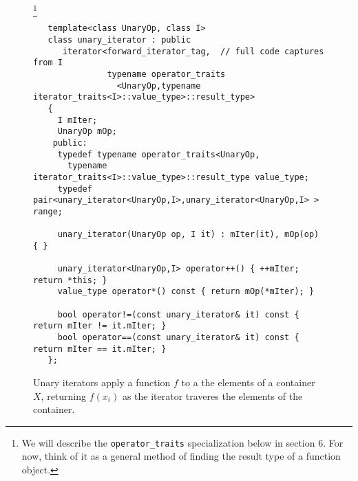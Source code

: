 \documentclass[12pt]{article}
\begin{document}
\begin{figure}
\label{figure:unary iterator}
\caption{Unary iterators apply a function $f$ to a the elements of a
container $X$, returning $f(x_i)$ as the iterator traveres the
elements of the container.}
\footnote{We will describe the {\tt operator\_traits} specialization
below in section 6. For now, think of it as a general method of
finding the result type of a function object.}
\begin{verbatim}
   template<class UnaryOp, class I>
   class unary_iterator : public 
      iterator<forward_iterator_tag,  // full code captures from I
               typename operator_traits
                 <UnaryOp,typename iterator_traits<I>::value_type>::result_type> 
   {
     I mIter;
     UnaryOp mOp;
    public:
     typedef typename operator_traits<UnaryOp, 
       typename iterator_traits<I>::value_type>::result_type value_type;
     typedef pair<unary_iterator<UnaryOp,I>,unary_iterator<UnaryOp,I> > range;
     
     unary_iterator(UnaryOp op, I it) : mIter(it), mOp(op) { }
     
     unary_iterator<UnaryOp,I> operator++() { ++mIter; return *this; }
     value_type operator*() const { return mOp(*mIter); }
     
     bool operator!=(const unary_iterator& it) const { return mIter != it.mIter; }
     bool operator==(const unary_iterator& it) const { return mIter == it.mIter; }
   };
\end{verbatim}
\end{figure}
\end{document}
